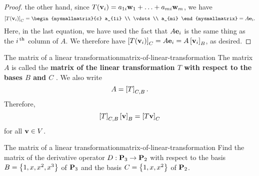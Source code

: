 \begin{proof}
  the other hand, since
  $T(\mbox{\bf v}_i) = a_{1i}\mbox{\bf w}_1 + \ldots + a_{mi}\mbox{\bf w}_m$,
  we have
  \begin{equation*}
    \coord{T(\vect{v}_i)}_C =
    \begin{mysmallmatrix}{c}
      a_{1i} \\ \vdots \\ a_{mi}
    \end{mysmallmatrix}
    = A\vect{e}_i.
  \end{equation*}
  Here, in the last equation, we have used the fact that $A\mbox{\bf e}_i$
  is the same thing as the $i^{\,\rm th}$ column of $A$. We therefore have
  $\left[T(\mbox{\bf v}_i)\right]_C = A\mbox{\bf e}_i = A \left[\mbox{\bf v}_i\right]_B$, as
  desired.
\end{proof}

\begin{definition}{The matrix of a linear transformation}{matrix-of-linear-transformation}
  The matrix $A$ is called the \textbf{matrix of the linear
    transformation\/ $T$ with respect to the bases $B$ and $C$}%
  .
  We also write
  \begin{equation*}
    A = \left[T\right]_{C,B}.
  \end{equation*}
  Therefore,
  \begin{equation*}
    \left[T\right]_{C,B}\left[\mbox{\bf v}\right]_B = \left[T\mbox{\bf v}\right]_C
  \end{equation*}
  for all $\mbox{\bf v}\in V$.
\end{definition}

\begin{example}{The matrix of a linear transformation}{matrix-of-linear-transformation}
  Find the matrix of the derivative operator $D:\mathbf{P}_3\to\mathbf{P}_2$
  with respect to the basis $B=\left\{1,x,x^2,x^3\right\}$ of $\mathbf{P}_3$ and the
  basis $C=\left\{1,x,x^2\right\}$ of $\mathbf{P}_2$.
\end{example}


